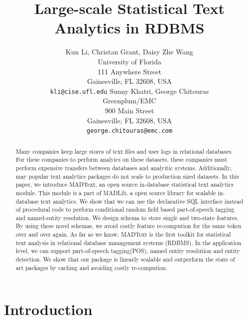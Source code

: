 \documentclass[11pt,letterpaper]{article}
\title{Large-scale Statistical Text Analytics in RDBMS\Thanks{This
    submitting for double-blind reviewing.}}
\author{Kun Li, Christan Grant, Daisy Zhe Wang\\
	    University of Florida\\
	    111 Anywhere Street\\
	    Gainesville, FL 32608, USA\\
	    {\tt kli@cise.ufl.edu}
	  \And
	Sunny Khatri, George Chitouras\\
  	Greenplum/EMC\\
  	900 Main Street\\
	    Gainesville, FL 32608, USA\\
  {\tt george.chitouras@emc.com}}
\date{}
\begin{document}
\maketitle
\begin{abstract}
Many companies keep large stores of text files and user logs in relational databases.
For these companies to perform analyics on these datasets, these companies must perform 
expensive transfers between databases and analyitic systems.
Additionally, may popular text analytics packages do not scale to production sized datasets.
In this paper, we introduce MADText, an open source in-database statistical text analytics module.
This module is a part of MADLib, a open source library for scalable in-database text analytics. 
We show that we can use the declarative SQL interface instead of procedural code to perform 
conditional random field based part-of-speech tagging and named-entity resolution. 
We design schema to store single and two-state features.
By using these novel schemas, we avoid costly feature re-compution for the same token over and over again.  
As far as we know, MADText is the first toolkit for statistical text analysis in relational database management systems (RDBMS).  
In the application level, we can support part-of-speech tagging(POS), named entity resolution and entity detection.  
We show that our package is linearly scalable and outperform the state of art packages by caching and avoiding costly re-compution.
\end{abstract}

\section{Introduction}
\end{document}
